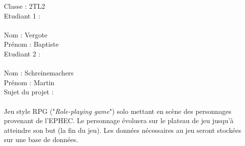 \documentclass[8pt,a4paper,titlepage]{report}
\author{Baptiste Vergote & Martin Schreinemachers}
\begin{document}
\clearpage
\noindent
{\huge Classe : 2TL2}\\[3cm]
{\huge Etudiant 1 :}\\\\
Nom : Vergote\\
Prénom : Baptiste\\[3cm]
{\huge Etudiant 2 : }\\\\
Nom : Schreinemachers\\
Prénom : Martin\\[3cm]
{\huge Sujet du projet :}\\\\
Jeu style RPG ("\textit{Role-playing game}") solo mettant en scène des personnages provenant de l'EPHEC. Le personnage évoluera sur le plateau de jeu jusqu'à atteindre son but (la fin du jeu). Les données nécessaires au jeu seront stockées sur une base de données.
\end{document}
